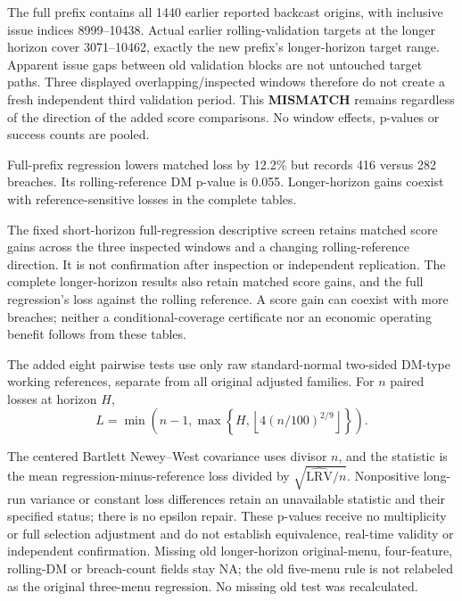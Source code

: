 \documentclass[10pt,a4paper]{article}
\begin{document}
The full prefix contains all 1440 earlier reported backcast origins,
with inclusive issue indices 8999--10438.
Actual earlier rolling-validation targets at the longer horizon cover 3071--10462,
exactly the new prefix's longer-horizon target range. Apparent issue gaps between old validation blocks
are not untouched target paths. Three displayed overlapping/inspected windows
therefore do not create a fresh independent third validation period. This
\textbf{MISMATCH} remains regardless of the direction of the added score
comparisons. No window effects, p-values or success counts are pooled.

Full-prefix regression lowers matched loss by 12.2\% but records 416 versus 282 breaches. Its rolling-reference DM p-value is 0.055. Longer-horizon gains coexist with reference-sensitive losses in the complete tables.




The fixed short-horizon full-regression descriptive screen retains matched
score gains across the three inspected windows and a changing rolling-reference
direction. It is not confirmation after inspection or independent replication.
The complete longer-horizon results also retain matched score gains, and the
full regression's loss against the rolling reference. A score gain can coexist
with more breaches; neither a conditional-coverage certificate nor an economic
operating benefit follows from these tables.

\begin{samepage}
The added eight pairwise tests use only raw standard-normal two-sided
DM-type working references, separate from all original adjusted families.
For \(n\) paired losses at horizon \(H\),
\[
L=\min\!\left(n-1,\max\!\left\{H,
\left\lfloor4(n/100)^{2/9}\right\rfloor\right\}\right).
\]
\end{samepage}
The centered Bartlett Newey--West covariance uses divisor \(n\), and the
statistic is the mean regression-minus-reference loss divided by
\(\sqrt{\widehat{\mathrm{LRV}}/n}\). Nonpositive long-run variance or constant
loss differences retain an unavailable statistic and their specified status;
there is no epsilon repair. These p-values receive no multiplicity or full
selection adjustment and do not establish equivalence, real-time validity or
independent confirmation. Missing old longer-horizon original-menu, four-feature,
rolling-DM or breach-count fields stay NA; the old five-menu rule is not relabeled
as the original three-menu regression. No missing old test was recalculated.
\end{document}
